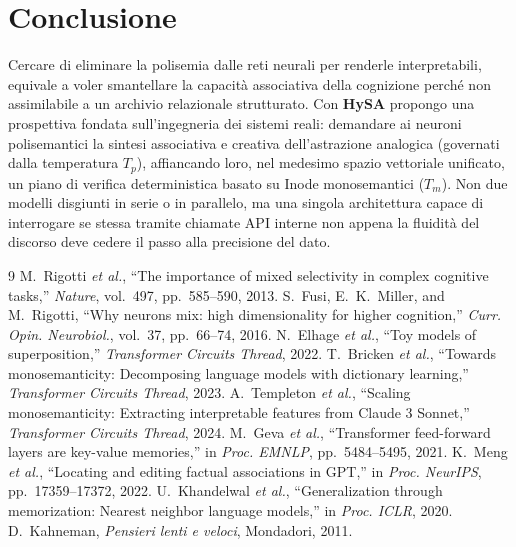 \documentclass[10pt,twocolumn]{article}
\theoremstyle{definition}
\begin{document}
\section{Conclusione}
Cercare di eliminare la polisemia dalle reti neurali per renderle interpretabili, equivale a voler smantellare la capacità associativa della cognizione perché non assimilabile a un archivio relazionale strutturato. Con \textbf{HySA} propongo una prospettiva fondata sull'ingegneria dei sistemi reali: demandare ai neuroni polisemantici la sintesi associativa e creativa dell'astrazione analogica (governati dalla temperatura $T_p$), affiancando loro, nel medesimo spazio vettoriale unificato, un piano di verifica deterministica basato su Inode monosemantici ($T_m$). Non due modelli disgiunti in serie o in parallelo, ma una singola architettura capace di interrogare se stessa tramite chiamate API interne non appena la fluidità del discorso deve cedere il passo alla precisione del dato.

\begin{thebibliography}{9}
\scriptsize
\setlength{\itemsep}{0.2pt}
\setlength{\parskip}{0pt}
 M.~Rigotti \textit{et al.}, ``The importance of mixed selectivity in complex cognitive tasks,'' \textit{Nature}, vol.~497, pp.~585--590, 2013.
 S.~Fusi, E.~K.~Miller, and M.~Rigotti, ``Why neurons mix: high dimensionality for higher cognition,'' \textit{Curr. Opin. Neurobiol.}, vol.~37, pp.~66--74, 2016.
 N.~Elhage \textit{et al.}, ``Toy models of superposition,'' \textit{Transformer Circuits Thread}, 2022.
 T.~Bricken \textit{et al.}, ``Towards monosemanticity: Decomposing language models with dictionary learning,'' \textit{Transformer Circuits Thread}, 2023.
 A.~Templeton \textit{et al.}, ``Scaling monosemanticity: Extracting interpretable features from Claude 3 Sonnet,'' \textit{Transformer Circuits Thread}, 2024.
 M.~Geva \textit{et al.}, ``Transformer feed-forward layers are key-value memories,'' in \textit{Proc. EMNLP}, pp.~5484--5495, 2021.
 K.~Meng \textit{et al.}, ``Locating and editing factual associations in GPT,'' in \textit{Proc. NeurIPS}, pp.~17359--17372, 2022.
 U.~Khandelwal \textit{et al.}, ``Generalization through memorization: Nearest neighbor language models,'' in \textit{Proc. ICLR}, 2020.
 D.~Kahneman, \textit{Pensieri lenti e veloci}, Mondadori, 2011.
\end{thebibliography}
\end{document}

